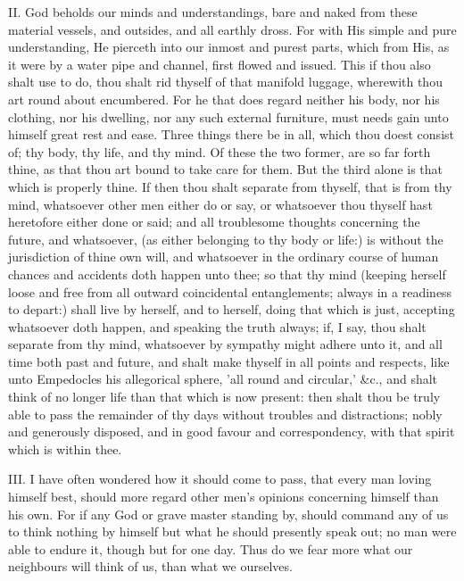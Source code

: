 II. God beholds our minds and understandings, bare and naked from these
material vessels, and outsides, and all earthly dross. For with His simple
and pure understanding, He pierceth into our inmost and purest parts,
which from His, as it were by a water pipe and channel, first flowed and
issued. This if thou also shalt use to do, thou shalt rid thyself of that
manifold luggage, wherewith thou art round about encumbered. For he that
does regard neither his body, nor his clothing, nor his dwelling, nor any
such external furniture, must needs gain unto himself great rest and ease.
Three things there be in all, which thou doest consist of; thy body, thy
life, and thy mind. Of these the two former, are so far forth thine, as
that thou art bound to take care for them. But the third alone is that
which is properly thine. If then thou shalt separate from thyself, that is
from thy mind, whatsoever other men either do or say, or whatsoever thou
thyself hast heretofore either done or said; and all troublesome thoughts
concerning the future, and whatsoever, (as either belonging to thy body or
life:) is without the jurisdiction of thine own will, and whatsoever in
the ordinary course of human chances and accidents doth happen unto thee;
so that thy mind (keeping herself loose and free from all outward
coincidental entanglements; always in a readiness to depart:) shall live
by herself, and to herself, doing that which is just, accepting whatsoever
doth happen, and speaking the truth always; if, I say, thou shalt separate
from thy mind, whatsoever by sympathy might adhere unto it, and all time
both past and future, and shalt make thyself in all points and respects,
like unto Empedocles his allegorical sphere, 'all round and circular,'
\&c., and shalt think of no longer life than that which is now present:
then shalt thou be truly able to pass the remainder of thy days without
troubles and distractions; nobly and generously disposed, and in good
favour and correspondency, with that spirit which is within thee.

III. I have often wondered how it should come to pass, that every man
loving himself best, should more regard other men's opinions concerning
himself than his own. For if any God or grave master standing by, should
command any of us to think nothing by himself but what he should presently
speak out; no man were able to endure it, though but for one day. Thus do
we fear more what our neighbours will think of us, than what we ourselves.

